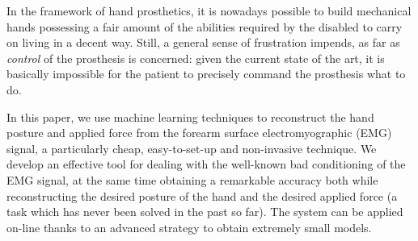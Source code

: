 In the framework of hand prosthetics, it is nowadays possible to build
mechanical hands possessing a fair amount of the abilities required by
the disabled to carry on living in a decent way. Still, a general
sense of frustration impends, as far as \emph{control} of the
prosthesis is concerned: given the current state of the art, it is
basically impossible for the patient to precisely command the
prosthesis what to do.

In this paper, we use machine learning techniques to reconstruct the
hand posture and applied force from the forearm surface
electromyographic (EMG) signal, a particularly cheap, easy-to-set-up
and non-invasive technique. We develop an effective tool for dealing
with the well-known bad conditioning of the EMG signal, at the same
time obtaining a remarkable accuracy both while reconstructing the
desired posture of the hand and the desired applied force (a task
which has never been solved in the past so far). The system can be
applied on-line thanks to an advanced strategy to obtain extremely
small models.
